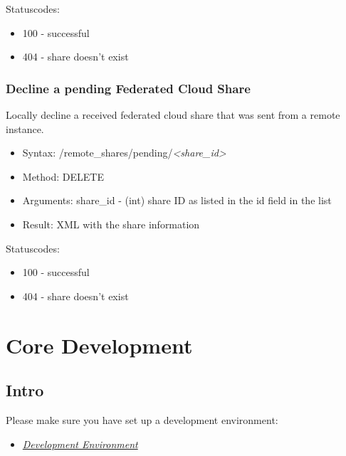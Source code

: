\documentclass[letterpaper,10pt,english]{sphinxmanual}
\begin{document}
Statuscodes:
\begin{itemize}
\item {} 
100 - successful

\item {} 
404 - share doesn't exist

\end{itemize}


\subsubsection{Decline a pending Federated Cloud Share}
\label{core/ocs-share-api:decline-a-pending-federated-cloud-share}
Locally decline a received federated cloud share that was sent from a remote instance.
\begin{itemize}
\item {} 
Syntax: /remote\_shares/pending/\emph{\textless{}share\_id\textgreater{}}

\item {} 
Method: DELETE

\item {} 
Arguments: share\_id - (int) share ID as listed in the id field in the  list

\item {} 
Result: XML with the share information

\end{itemize}

Statuscodes:
\begin{itemize}
\item {} 
100 - successful

\item {} 
404 - share doesn't exist

\end{itemize}


\section{Core Development}
\label{core/index:core-development}

\subsection{Intro}
\label{core/index:intro}
Please make sure you have set up a development environment:
\begin{itemize}
\item {} 
{\hyperref[general/devenv::doc]{\emph{\emph{Development Environment}}}}

\end{itemize}
\end{document}
